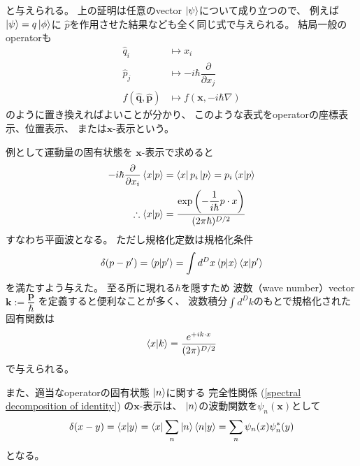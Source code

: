 と与えられる。
上の証明は任意のvector
$\ket{\psi}$について成り立つので、
例えば$\ket{\psi} = q \ket{\phi}$に
$\hat{p}$を作用させた結果なども全く同じ式で与えられる。
結局一般のoperatorも
\begin{subequations}
\begin{align}
    \hat{q}_i
    &\mapsto
    x_i
\\
    \hat{p}_j
    &\mapsto
    - i \hbar
    \dfrac{\partial}{\partial x_j}
\\
    f( \hat{\bm{q}}, \hat{\bm{p}} )
    &\mapsto
    f
    \left( \bm{x}, 
        - i \hbar
        \nabla
    \right)
\end{align}
\end{subequations}
のように置き換えればよいことが分かり、
このような表式をoperatorの座標表示、位置表示、
または$\bm{x}$-表示という。

例として運動量の固有状態を
$\bm{x}$-表示で求めると
\begin{align}
    - i \hbar
    \dfrac{\partial}{\partial x_i}
    \braket{ x | p }
    &=
    \bra{ x }
    p_i
    \ket{ p }
    =
    p_i
    \braket{ x | p }
\notag\\\therefore
    \braket{ x | p }
    &=
    \dfrac{
        \exp\left(
            -
            \dfrac{1}{i\hbar}
            p \cdot x
        \right)
    }{ (2 \pi \hbar)^{D/2} }
\label{plain wave in qm}
\end{align}
すなわち平面波となる。
ただし規格化定数は規格化条件
\begin{align}
    \delta( p - p' )
    =
    \braket{ p | p' }
    =
    \int d^D x
    \braket{ p | x }
    \braket{ x | p' }
\end{align}
を満たすよう与えた。
至る所に現れる$\hbar$を隠すため
波数（wave number）vector
$\bm{k} := \dfrac{ \bm{p} }{\hbar}$
を定義すると便利なことが多く、
波数積分$\int d^D k$のもとで規格化された
固有関数は
\begin{align}
    \braket{x | k}
    =
    \dfrac{
        e^{
            + i
            k \cdot x
        }
    }{ (2 \pi)^{D/2} }
\end{align}
で与えられる。

また、適当なoperatorの固有状態
$\ket{n}$に関する
完全性関係
(\ref{spectral decomposition of identity})
の$\bm{x}$-表示は、
$\ket{n}$の波動関数を$\psi_n( \bm{x} )$として
\begin{align}
    \delta(x - y)
    =
    \braket{ x | y }
    =
    \bra{ x }
        \sum_n
        \ket{n}
        \braket{ n | y }
    =
    \sum_n
    \psi_n( x )
    \psi_n^*( y )
\label{complete set of wave function}
\end{align}
となる。


